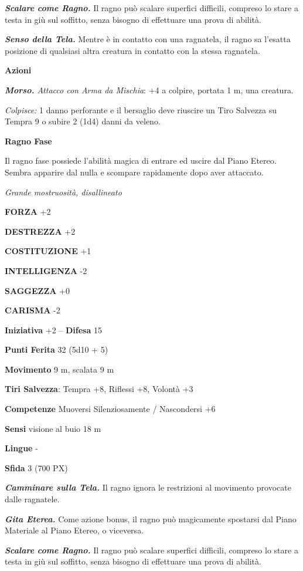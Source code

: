 \begin{multicols}{2}
	\textit{\textbf{Scalare come Ragno.}} Il ragno può scalare superfici difficili, compreso lo stare a testa in giù sul soffitto, senza bisogno di effettuare una prova di abilità.

	\textit{\textbf{Senso della Tela.}} Mentre è in contatto con una ragnatela, il ragno sa l'esatta posizione di qualsiasi altra creatura in contatto con la stessa ragnatela.

	\textbf{Azioni}

	\textit{\textbf{Morso.} Attacco con Arma da Mischia}: +4 a colpire, portata 1 m, una creatura.

	\textit{Colpisce:} 1 danno perforante e il bersaglio deve riuscire un Tiro Salvezza su Tempra 9 o subire 2 (1d4) danni da veleno.

	\medskip\textbf{Ragno Fase}

	Il ragno fase possiede l'abilità magica di entrare ed uscire dal Piano Etereo. Sembra apparire dal nulla e scompare rapidamente dopo aver attaccato.

	\textit{Grande mostruosità, disallineato}

	\textbf{FORZA} +2

	\textbf{DESTREZZA} +2

	\textbf{COSTITUZIONE} +1

	\textbf{INTELLIGENZA} -2

	\textbf{SAGGEZZA} +0

	\textbf{CARISMA} -2

	\textbf{Iniziativa} +2 -- \textbf{Difesa} 15

	\textbf{Punti Ferita} 32 (5d10 + 5)

	\textbf{Movimento} 9 m, scalata 9 m

	\textbf{Tiri Salvezza}: Tempra +8, Riflessi +8, Volontà +3

	\textbf{Competenze} Muoversi Silenziosamente / Nascondersi +6

	\textbf{Sensi} visione al buio 18 m

	\textbf{Lingue} -

	\textbf{Sfida} 3 (700 PX)

	\textit{\textbf{Camminare sulla Tela.}} Il ragno ignora le restrizioni al movimento provocate dalle ragnatele.

	\textit{\textbf{Gita Eterea.}} Come azione bonus, il ragno può magicamente spostarsi dal Piano Materiale al Piano Etereo, o viceversa.

	\textit{\textbf{Scalare come Ragno.}} Il ragno può scalare superfici difficili, compreso lo stare a testa in giù sul soffitto, senza bisogno di effettuare una prova di abilità.


\end{multicols}
